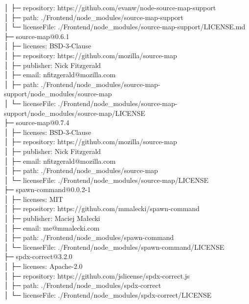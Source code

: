 \documentclass[
    paper=a4,
    twoside=false,
    parskip=half,
    listof=entryprefix,
    listof=totoc,
    index=totoc,
    bibliography=totoc,
    headsepline,
]{scrbook}
\begin{document}
    │  ├─ repository: https://github.com/evanw/node-source-map-support\\
    │  ├─ path: ./Frontend/node\_modules/source-map-support\\
    │  └─ licenseFile: ./Frontend/node\_modules/source-map-support/LICENSE.md\\
    ├─ source-map@0.6.1\\
    │  ├─ licenses: BSD-3-Clause\\
    │  ├─ repository: https://github.com/mozilla/source-map\\
    │  ├─ publisher: Nick Fitzgerald\\
    │  ├─ email: nfitzgerald@mozilla.com\\
    │  ├─ path: ./Frontend/node\_modules/source-map-support/node\_modules/source-map\\
    │  └─ licenseFile: ./Frontend/node\_modules/source-map-support/node\_modules/source-map/LICENSE\\
    ├─ source-map@0.7.4\\
    │  ├─ licenses: BSD-3-Clause\\
    │  ├─ repository: https://github.com/mozilla/source-map\\
    │  ├─ publisher: Nick Fitzgerald\\
    │  ├─ email: nfitzgerald@mozilla.com\\
    │  ├─ path: ./Frontend/node\_modules/source-map\\
    │  └─ licenseFile: ./Frontend/node\_modules/source-map/LICENSE\\
    ├─ spawn-command@0.0.2-1\\
    │  ├─ licenses: MIT\\
    │  ├─ repository: https://github.com/mmalecki/spawn-command\\
    │  ├─ publisher: Maciej Małecki\\
    │  ├─ email: me@mmalecki.com\\
    │  ├─ path: ./Frontend/node\_modules/spawn-command\\
    │  └─ licenseFile: ./Frontend/node\_modules/spawn-command/LICENSE\\
    ├─ spdx-correct@3.2.0\\
    │  ├─ licenses: Apache-2.0\\
    │  ├─ repository: https://github.com/jslicense/spdx-correct.js\\
    │  ├─ path: ./Frontend/node\_modules/spdx-correct\\
    │  └─ licenseFile: ./Frontend/node\_modules/spdx-correct/LICENSE\\
\end{document}
